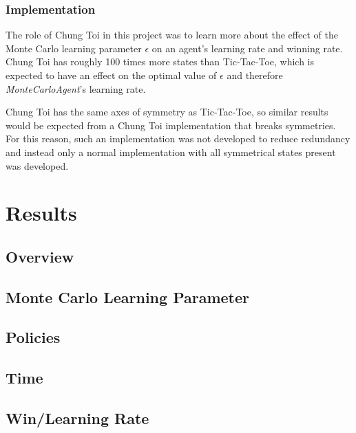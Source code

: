 \documentclass[11pt,a4paper]{report}
\begin{document}
\subsection{Implementation}

The role of Chung Toi in this project was to learn more about the effect of the Monte Carlo learning parameter $\epsilon$ on an agent's learning rate and winning rate. Chung Toi has roughly 100 times more states than Tic-Tac-Toe, which is expected to have an effect on the optimal value of $\epsilon$ and therefore \emph{MonteCarloAgent}'s learning rate.

Chung Toi has the same axes of symmetry as Tic-Tac-Toe, so similar results would be expected from a Chung Toi implementation that breaks symmetries. For this reason, such an implementation was not developed to reduce redundancy and instead only a normal implementation with all symmetrical states present was developed.


\chapter{Results}


\section{Overview}


\section{Monte Carlo Learning Parameter}


\section{Policies} %


\section{Time}


\section{Win/Learning Rate}
\end{document}
